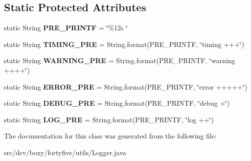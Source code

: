 \subsection*{Static Protected Attributes}
\begin{DoxyCompactItemize}
\item 
\hypertarget{classdev_1_1boxy_1_1fortyfive_1_1utils_1_1_logger_ac634e9f2908d8f2fde6872c0316fea31}{
static String {\bfseries PRE\_\-PRINTF} = \char`\"{}\%12s \char`\"{}}
\label{d8/d25/classdev_1_1boxy_1_1fortyfive_1_1utils_1_1_logger_ac634e9f2908d8f2fde6872c0316fea31}

\item 
\hypertarget{classdev_1_1boxy_1_1fortyfive_1_1utils_1_1_logger_a91c3f414bea3ea5c7980dc3368a1fd49}{
static String {\bfseries TIMING\_\-PRE} = String.format(PRE\_\-PRINTF, \char`\"{}timing +++\char`\"{})}
\label{d8/d25/classdev_1_1boxy_1_1fortyfive_1_1utils_1_1_logger_a91c3f414bea3ea5c7980dc3368a1fd49}

\item 
\hypertarget{classdev_1_1boxy_1_1fortyfive_1_1utils_1_1_logger_a3bb471b1068096a4e181872ff6401c84}{
static String {\bfseries WARNING\_\-PRE} = String.format(PRE\_\-PRINTF, \char`\"{}warning ++++\char`\"{})}
\label{d8/d25/classdev_1_1boxy_1_1fortyfive_1_1utils_1_1_logger_a3bb471b1068096a4e181872ff6401c84}

\item 
\hypertarget{classdev_1_1boxy_1_1fortyfive_1_1utils_1_1_logger_afa4f6c9801ea762b6ec730dc0f6e7a2b}{
static String {\bfseries ERROR\_\-PRE} = String.format(PRE\_\-PRINTF, \char`\"{}error +++++\char`\"{})}
\label{d8/d25/classdev_1_1boxy_1_1fortyfive_1_1utils_1_1_logger_afa4f6c9801ea762b6ec730dc0f6e7a2b}

\item 
\hypertarget{classdev_1_1boxy_1_1fortyfive_1_1utils_1_1_logger_a6fea38b5714a729d543ffc23567542ad}{
static String {\bfseries DEBUG\_\-PRE} = String.format(PRE\_\-PRINTF, \char`\"{}debug +\char`\"{})}
\label{d8/d25/classdev_1_1boxy_1_1fortyfive_1_1utils_1_1_logger_a6fea38b5714a729d543ffc23567542ad}

\item 
\hypertarget{classdev_1_1boxy_1_1fortyfive_1_1utils_1_1_logger_a25777938bb660bcd8d6caf9f1e7dc1b6}{
static String {\bfseries LOG\_\-PRE} = String.format(PRE\_\-PRINTF, \char`\"{}log ++\char`\"{})}
\label{d8/d25/classdev_1_1boxy_1_1fortyfive_1_1utils_1_1_logger_a25777938bb660bcd8d6caf9f1e7dc1b6}

\end{DoxyCompactItemize}


The documentation for this class was generated from the following file:\begin{DoxyCompactItemize}
\item 
src/dev/boxy/fortyfive/utils/Logger.java\end{DoxyCompactItemize}
